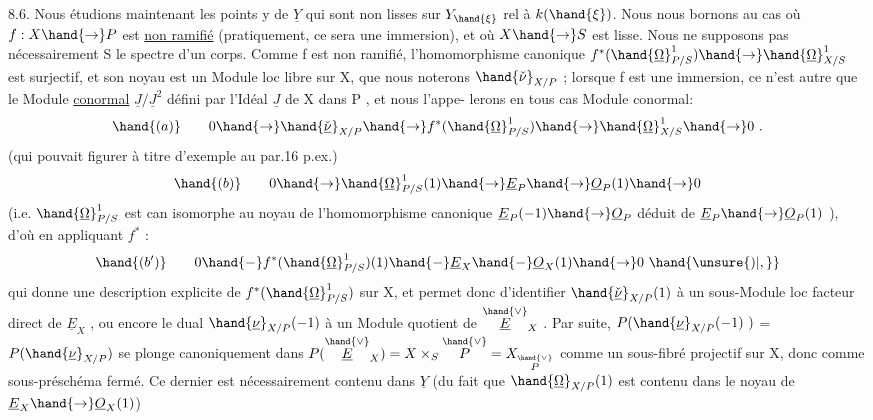 
8.6. Nous étudions maintenant les points  y de $\underline{Y}$ qui sont non lisses
sur $Y_{\hand{\xi}}$ rel à $k(\hand{\xi})$. Nous nous  bornons au cas où  $f:X\hand{\to} P$  est \uline{non ramifié}
(pratiquement, ce sera une immersion), et où $X\hand{\to} S$ est lisse.  Nous ne
supposons pas nécessairement S le spectre d'un corps.  
 Comme
f  est non ramifié, l'homomorphisme canonique   $f^*(\hand{\underline{\Omega}}^1_{P/S})\hand{\to}\hand{\underline{\Omega}}^1_{X/S}$
est surjectif, et son noyau est un Module loc libre sur X, que nous
noterons  $\hand{\check{\nu}}_{X/P}$ ; lorsque f est une immersion, ce n'est autre que le
Module \uline{conormal}  $\underline{J}/\underline{J}^2$  défini par l'Idéal $\underline{J}$ de X dans P , et nous l'appe-%
lerons en tous cas Module conormal:
\[ \hand{(a)} \qquad 0\hand{\to}\hand{\check{\underline{\nu}}}_{X/P}\hand{\to} f^*(\hand{\underline{\Omega}}^1_{P/S})\hand{\to}\hand{\underline{\Omega}}^1_{X/S}\hand{\to} 0 \ . \]
\placedmargin{\hand{$|||$}}
(qui pouvait figurer à titre d'exemple au par.16 p.ex.)
\[ \hand{(b)} \qquad 0\hand{\to}\hand{\underline{\Omega}}^1_{P/S}(1)\hand{\to}\underline{E}_P\hand{\to}\underline{O}_P(1)\hand{\to} 0 \]
(i.e. $\hand{\underline{\Omega}}^1_{P/S}$ est can isomorphe au noyau de l'homomorphisme canonique
$\underline{E}_P(-1)\hand{\to}\underline{O}_P$  déduit de $\underline{E}_P\hand{\to}\underline{O}_P(1)$ ), d'où en appliquant $f^*$ :
\[ \hand{(b')} \qquad 0 \hand{-} f^*(\hand{\underline{\Omega}}^1_{P/S})(1) \hand{-} \underline{E}_X \hand{-} \underline{O}_X(1)\hand{\to} 0 \ \hand{\unsure{)|,}} \]
qui donne une description explicite de  $f^*(\hand{\underline{\Omega}}^1_{P/S})$   sur X, et
permet  donc d'identifier $\hand{\check{\underline{\nu}}}_{X/P}(1)$  à un sous-Module loc facteur direct
de $\underline{E}_X$ , ou encore le  dual  $\hand{\underline{\nu}}_{X/P}(-1)$  à un Module
quotient de $\overset{\hand{\vee}}{\underline{E}}_X$ .  Par suite,   $P(\hand{\underline{\nu}}_{X/P}(-1)\ )$  =  $P(\hand{\underline{\nu}}_{X/P})$  se plonge
canoniquement dans  $P(\overset{\hand{\vee}}{\underline{E}}_X) = X\times_S\overset{\hand{\vee}}{P} = X_{\overset{\hand{\vee}}{P}}$ comme un sous-fibré projectif sur
X, donc comme sous-préschéma fermé. Ce dernier est nécessairement contenu
dans $\underline{Y}$  (du fait que $\hand{\underline{\Omega}}_{X/P}(1)$  est contenu dans le noyau de  $\underline{E}_X\hand{\to}\underline{O}_X(1)$)





